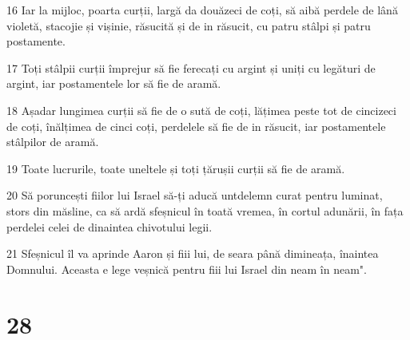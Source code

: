 \par 16 Iar la mijloc, poarta curții, largă da douăzeci de coți, să aibă perdele de lână violetă, stacojie și vișinie, răsucită și de in răsucit, cu patru stâlpi și patru postamente.
\par 17 Toți stâlpii curții împrejur să fie ferecați cu argint și uniți cu legături de argint, iar postamentele lor să fie de aramă.
\par 18 Așadar lungimea curții să fie de o sută de coți, lățimea peste tot de cincizeci de coți, înălțimea de cinci coți, perdelele să fie de in răsucit, iar postamentele stâlpilor de aramă.
\par 19 Toate lucrurile, toate uneltele și toți țărușii curții să fie de aramă.
\par 20 Să poruncești fiilor lui Israel să-ți aducă untdelemn curat pentru luminat, stors din măsline, ca să ardă sfeșnicul în toată vremea, în cortul adunării, în fața perdelei celei de dinaintea chivotului legii.
\par 21 Sfeșnicul îl va aprinde Aaron și fiii lui, de seara până dimineața, înaintea Domnului. Aceasta e lege veșnică pentru fiii lui Israel din neam în neam".

\chapter{28}

